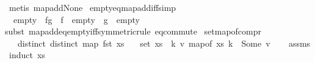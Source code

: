\begin{isabellebody}
\isadelimproof
%
\endisadelimproof
%
\isatagproof
{}\isamarkupfalse%
\ {\isacharparenleft}{\kern0pt}metis\ map{\isacharunderscore}{\kern0pt}add{\isacharunderscore}{\kern0pt}None{\isacharparenright}{\kern0pt}%
\endisatagproof
{\isafoldproof}%
%
\isadelimproof
\isanewline
%
\endisadelimproof
\isanewline
{}\isamarkupfalse%
\ empty{\isacharunderscore}{\kern0pt}eq{\isacharunderscore}{\kern0pt}map{\isacharunderscore}{\kern0pt}add{\isacharunderscore}{\kern0pt}iff{\isacharbrackleft}{\kern0pt}simp{\isacharbrackright}{\kern0pt}{\isacharcolon}{\kern0pt}\isanewline
\ \ {\isachardoublequoteopen}{\isacharparenleft}{\kern0pt}empty\ {\isacharequal}{\kern0pt}\ f{\isacharplus}{\kern0pt}{\isacharplus}{\kern0pt}g{\isacharparenright}{\kern0pt}\ {\isasymlongleftrightarrow}\ f\ {\isacharequal}{\kern0pt}\ empty\ {\isasymand}\ g\ {\isacharequal}{\kern0pt}\ empty{\isachardoublequoteclose}\isanewline
%
\isadelimproof
%
\endisadelimproof
%
\isatagproof
{}\isamarkupfalse%
{\isacharparenleft}{\kern0pt}subst\ map{\isacharunderscore}{\kern0pt}add{\isacharunderscore}{\kern0pt}eq{\isacharunderscore}{\kern0pt}empty{\isacharunderscore}{\kern0pt}iff{\isacharbrackleft}{\kern0pt}symmetric{\isacharbrackright}{\kern0pt}{\isacharparenright}{\kern0pt}{\isacharparenleft}{\kern0pt}rule\ eq{\isacharunderscore}{\kern0pt}commute{\isacharparenright}{\kern0pt}%
\endisatagproof
{\isafoldproof}%
%
\isadelimproof
%
\endisadelimproof
%
\isadelimdocument
%
\endisadelimdocument
%
\isatagdocument
%
\isamarkuptrue%
%
\endisatagdocument
{\isafolddocument}%
%
\isadelimdocument
%
\endisadelimdocument
{}\isamarkupfalse%
\ set{\isacharunderscore}{\kern0pt}map{\isacharunderscore}{\kern0pt}of{\isacharunderscore}{\kern0pt}compr{\isacharcolon}{\kern0pt}\isanewline
\ \ \ distinct{\isacharcolon}{\kern0pt}\ {\isachardoublequoteopen}distinct\ {\isacharparenleft}{\kern0pt}map\ fst\ xs{\isacharparenright}{\kern0pt}{\isachardoublequoteclose}\isanewline
\ \ \ {\isachardoublequoteopen}set\ xs\ {\isacharequal}{\kern0pt}\ {\isacharbraceleft}{\kern0pt}{\isacharparenleft}{\kern0pt}k{\isacharcomma}{\kern0pt}\ v{\isacharparenright}{\kern0pt}{\isachardot}{\kern0pt}\ map{\isacharunderscore}{\kern0pt}of\ xs\ k\ {\isacharequal}{\kern0pt}\ Some\ v{\isacharbraceright}{\kern0pt}{\isachardoublequoteclose}\isanewline
%
\isadelimproof
\ \ %
\endisadelimproof
%
\isatagproof
{}\isamarkupfalse%
\ assms\isanewline
{}\isamarkupfalse%
\ {\isacharparenleft}{\kern0pt}induct\ xs{\isacharparenright}{\kern0pt}\isanewline

\end{isabellebody}

